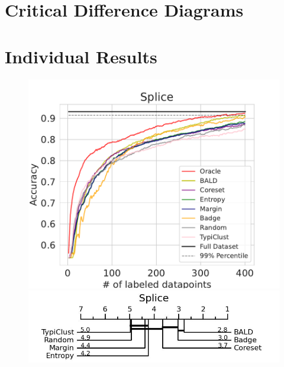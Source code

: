 \documentclass[]{article}
\begin{document}
\section{Critical Difference Diagrams}\label{app:cd_diagrams}

\section{Individual Results}\label{app:all_results}
\begin{minipage}{0.65\linewidth}
\begin{figure}[H]
    \centering
    \includegraphics[width=\linewidth]{img/eval_splice}\\ [2mm]
    \includegraphics[width=\linewidth]{img/micro_splice.jpg}
\end{figure}
\end{minipage}
\end{document}
